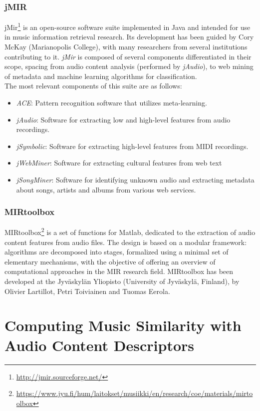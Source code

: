 \subsubsection*{jMIR}
jMir\footnote{\url{http://jmir.sourceforge.net/}} is an open-source software suite implemented in Java and intended for use in music information retrieval research. Its development has been guided by Cory McKay (Marianopolis College), with many researchers from several institutions contributing to it. \textit{jMir} is composed of several components differentiated in their scope, spacing from audio content analysis (performed by \textit{jAudio}), to web mining of metadata and machine learning algorithms for classification. \\ The most relevant components of this suite are as follows:
\begin{itemize}
\item \textit{ACE}: Pattern recognition software that utilizes meta-learning. 
\item \textit{jAudio}: Software for extracting low and high-level features from audio recordings.
\item \textit{jSymbolic}: Software for extracting high-level features from MIDI recordings.
\item \textit{jWebMiner}: Software for extracting cultural features from web text
\item \textit{jSongMiner}: Software for identifying unknown audio and extracting metadata about songs, artists and albums from various web services.
\end{itemize}


\subsubsection*{MIRtoolbox}
MIRtoolbox\footnote{\url{https://www.jyu.fi/hum/laitokset/musiikki/en/research/coe/materials/mirtoolbox}} is a set of functions for Matlab, dedicated to the extraction of audio content features from audio files. The design is based on a modular framework: algorithms are decomposed into stages, formalized using a minimal set of elementary mechanisms, with the objective of offering an overview of computational approaches in the MIR research field. MIRtoolbox has been developed at the Jyväskylän Yliopisto (University of Jyväskylä, Finland), by Olivier Lartillot, Petri Toiviainen and Tuomas Eerola.


\section{Computing Music Similarity with Audio Content Descriptors}
\label{sec:audiocontentsimilarity}

